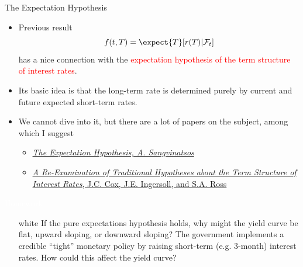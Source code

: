 \documentclass{beamer}
\begin{document}
\begin{frame}{The Expectation Hypothesis}
	\begin{itemize}
		\item Previous result
		\begin{equation*}
			f(t, T) = \expect{T}[r(T)|\mathcal{F}_t]
		\end{equation*}
		has a nice connection with the \textcolor{red}{expectation hypothesis of the term structure of interest rates}.
		\item Its basic idea is that the long-term rate is determined purely by current and future expected short-term rates.
		\item We cannot dive into it, but there are a lot of papers on the subject, among which I suggest
		\begin{itemize}
			\item \href{https://pages.stern.nyu.edu/~sternfin/asangvin/ExpHyp.pdf}{\emph{The Expectation Hypothesis, A. Sangvinatsos}}
			\item \href{https://www.jstor.org/stable/2327547}{\emph{A Re-Examination of Traditional Hypotheses about the Term Structure of Interest Rates}, J.C. Cox, J.E. Ingersoll, and S.A. Ross}
		\end{itemize}
	\end{itemize}
\end{frame}

\begin{homework}
	\begin{frame}{\textcolor{white}{Homework}}
\begin{itemize}
	\item[white] If the pure expectations hypothesis holds, why might the yield curve be flat, upward sloping, or downward sloping? The government implements a credible “tight” monetary policy by raising short-term (e.g. 3-month) interest rates. How could this affect the yield curve?
\end{itemize}
\end{frame}
\end{homework}
\end{document}
